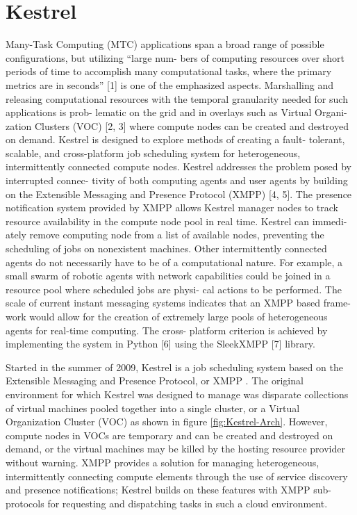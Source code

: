 \chapter{Kestrel}
\label{chap:Kestrel} 

Many-Task Computing (MTC) applications span a broad range of possible
configurations, but utilizing “large num- bers of computing resources over
short periods of time to accomplish many computational tasks, where the primary
metrics are in seconds” [1] is one of the emphasized aspects. Marshalling
and releasing computational resources with the temporal granularity needed for
such applications is prob- lematic on the grid and in overlays such as Virtual
Organi- zation Clusters (VOC) [2, 3] where compute nodes can be created and
destroyed on demand. Kestrel is designed to explore methods of creating a fault-
tolerant, scalable, and cross-platform job scheduling system for heterogeneous,
intermittently connected compute nodes. Kestrel addresses the problem posed
by interrupted connec- tivity of both computing agents and user agents by
building on the Extensible Messaging and Presence Protocol (XMPP) [4, 5]. The
presence notification system provided by XMPP allows Kestrel manager nodes to
track resource availability in the compute node pool in real time. Kestrel can
immedi- ately remove computing node from a list of available nodes, preventing
the scheduling of jobs on nonexistent machines. Other intermittently connected
agents do not necessarily have to be of a computational nature. For example, a
small swarm of robotic agents with network capabilities could be joined in a
resource pool where scheduled jobs are physi- cal actions to be performed. The
scale of current instant messaging systems indicates that an XMPP based frame-
work would allow for the creation of extremely large pools of heterogeneous
agents for real-time computing. The cross- platform criterion is achieved by
implementing the system in Python [6] using the SleekXMPP [7] library.


Started in the summer of 2009, Kestrel is a job scheduling system
based on the Extensible Messaging and Presence Protocol, or XMPP
\cite{RFC3920,RFC3921}. The original environment for
which Kestrel was designed to manage was disparate collections of virtual
machines pooled together into a single cluster, or a Virtual Organization
Cluster (VOC) \cite{Murphy2009} as shown in figure \ref{fig:Kestrel-Arch}.
However, compute nodes in VOCs are temporary and can be created and destroyed
on demand, or the virtual machines may be killed by the hosting resource
provider without warning. XMPP provides a solution for managing heterogeneous,
intermittently connecting compute elements through the use of service discovery
and presence notifications; Kestrel builds on these features with XMPP
sub-protocols for requesting and dispatching tasks in such a cloud environment.


